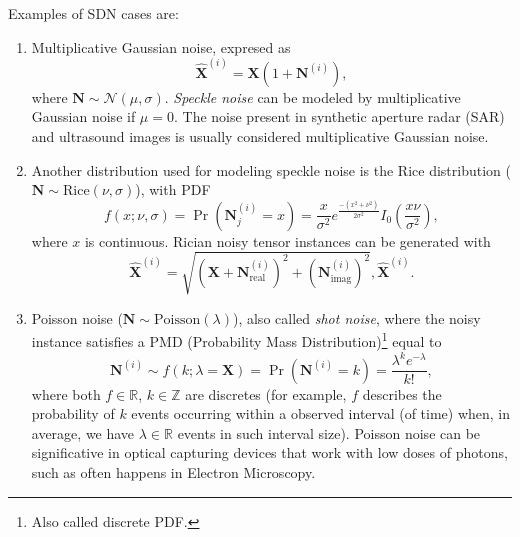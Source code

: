 \documentclass{article}
\begin{document}
Examples of SDN cases are:
\begin{enumerate}
\item Multiplicative Gaussian noise, expresed as
  \begin{equation}
    \hat{\mathbf X}^{(i)} = {\mathbf X} (1 + {\mathbf N}^{(i)}),
    \label{eq:MGN}
  \end{equation}
  where ${\mathbf N}\sim{\mathcal N}(\mu,\sigma)$. \emph{Speckle
    noise} can be modeled by multiplicative Gaussian noise if
  $\mu=0$. The noise present in synthetic aperture radar (SAR) and
  ultrasound images is usually considered multiplicative Gaussian
  noise.

\item Another distribution used for modeling speckle noise is the Rice
  distribution ($\mathbf{N}\sim\mathrm{Rice}(\nu,\sigma)$), with PDF
  \begin{equation}
    f(x; \nu,\sigma) = \Pr({\mathbf N}^{(i)}_j{=}x) = \frac{x}{\sigma^2}e^{\frac{-(x^2+\nu^2)}{2\sigma^2}}I_0\left(\frac{x\nu}{\sigma^2}\right),
  \end{equation}
  where $x$ is continuous. Rician noisy tensor instances can be generated with
  \begin{equation}
    \hat{\mathbf X}^{(i)} = \sqrt{ ({\mathbf X} + {\mathbf N}_{\text{real}}^{(i)})^2 + ({\mathbf N}_{\text{imag}}^{(i)})^2}, \hat{\mathbf X}^{(i)}.
  \end{equation}

\item Poisson noise ($\mathbf{N}\sim\mathrm{Poisson}(\lambda)$), also
  called \emph{shot noise}, where the noisy instance satisfies a PMD
  (Probability Mass Distribution)\footnote{Also called discrete PDF.}
  equal to
  \begin{equation}
    {\mathbf N}^{(i)} \sim f(k; \lambda={\mathbf X}) = \Pr({\mathbf N}^{(i)}{=}k) = \frac{\lambda^k e^{-\lambda}}{k!},
    \label{eq:PN}
  \end{equation}
  where both $f\in\mathbb{R}$, $k\in\mathbb{Z}$ are discretes (for
  example, $f$ describes the probability of $k$ events occurring
  within a observed interval (of time) when, in average,
  we have $\lambda\in\mathbb{R}$ events in such interval
  size). Poisson noise can be significative in optical capturing
  devices that work with low doses of photons, such as often happens
  in Electron Microscopy.


\end{enumerate}
\end{document}
